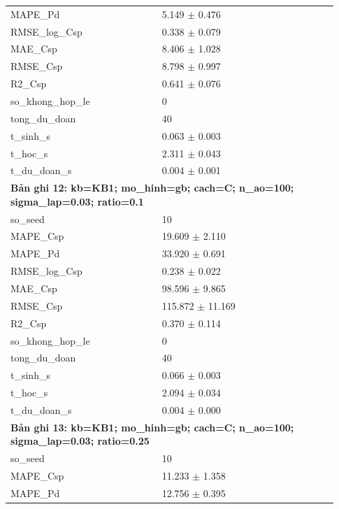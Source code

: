 \begin{longtable}{p{0.43\linewidth}p{0.50\linewidth}}
MAPE\_\allowbreak Pd & 5.149 $\pm$ 0.476 \\
RMSE\_\allowbreak log\_\allowbreak Csp & 0.338 $\pm$ 0.079 \\
MAE\_\allowbreak Csp & 8.406 $\pm$ 1.028 \\
RMSE\_\allowbreak Csp & 8.798 $\pm$ 0.997 \\
R2\_\allowbreak Csp & 0.641 $\pm$ 0.076 \\
so\_\allowbreak khong\_\allowbreak hop\_\allowbreak le & 0 \\
tong\_\allowbreak du\_\allowbreak doan & 40 \\
t\_\allowbreak sinh\_\allowbreak s & 0.063 $\pm$ 0.003 \\
t\_\allowbreak hoc\_\allowbreak s & 2.311 $\pm$ 0.043 \\
t\_\allowbreak du\_\allowbreak doan\_\allowbreak s & 0.004 $\pm$ 0.001 \\
\midrule
\multicolumn{2}{p{0.95\linewidth}}{\textbf{Bản ghi 12: kb=KB1; mo\_hinh=gb; cach=C; n\_ao=100; sigma\_lap=0.03; ratio=0.1}} \\
so\_\allowbreak seed & 10 \\
MAPE\_\allowbreak Csp & 19.609 $\pm$ 2.110 \\
MAPE\_\allowbreak Pd & 33.920 $\pm$ 0.691 \\
RMSE\_\allowbreak log\_\allowbreak Csp & 0.238 $\pm$ 0.022 \\
MAE\_\allowbreak Csp & 98.596 $\pm$ 9.865 \\
RMSE\_\allowbreak Csp & 115.872 $\pm$ 11.169 \\
R2\_\allowbreak Csp & 0.370 $\pm$ 0.114 \\
so\_\allowbreak khong\_\allowbreak hop\_\allowbreak le & 0 \\
tong\_\allowbreak du\_\allowbreak doan & 40 \\
t\_\allowbreak sinh\_\allowbreak s & 0.066 $\pm$ 0.003 \\
t\_\allowbreak hoc\_\allowbreak s & 2.094 $\pm$ 0.034 \\
t\_\allowbreak du\_\allowbreak doan\_\allowbreak s & 0.004 $\pm$ 0.000 \\
\midrule
\multicolumn{2}{p{0.95\linewidth}}{\textbf{Bản ghi 13: kb=KB1; mo\_hinh=gb; cach=C; n\_ao=100; sigma\_lap=0.03; ratio=0.25}} \\
so\_\allowbreak seed & 10 \\
MAPE\_\allowbreak Csp & 11.233 $\pm$ 1.358 \\
MAPE\_\allowbreak Pd & 12.756 $\pm$ 0.395 \\

\end{longtable}
